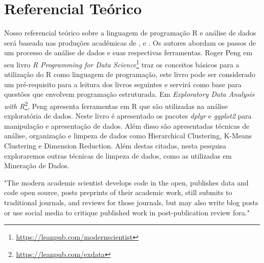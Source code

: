 \chapter[Referencial Teórico]{Referencial Teórico}

Nosso referencial teórico sobre a linguagem de programação R e análise de dados 
será baseada nas produções acadêmicas de , e 
. Os autores abordam os passos de um processo de análise de dados e 
suas respectivas ferramentas. Roger Peng em seu livro \emph{R Programming for Data 
Science}\footnote{\url{https://leanpub.com/modernscientist}}  traz os conceitos básicos para a utilização do R como linguagem de 
programação, este livro pode ser considerado um pré-requisito para a leitura dos 
livros seguintes e servirá como base para questões que envolvem programação 
estruturada. Em \emph{Exploratory Data Analysis with R}\footnote{\url{https://leanpub.com/exdata}}, Peng apresenta ferramentas 
em R que são utilizadas na análise exploratória de dados. Neste livro é 
apresentado os pacotes \emph{dplyr} e \emph{ggplot2} para manipulação e apresentação de 
dados. Além disso são apresentadas técnicas de análise, organização e limpeza de 
dados como Hierarchical Clustering, K-Means Clustering e Dimension Reduction. 
Além destas citadas, nesta pesquisa exploraremos outras técnicas de limpeza de 
dados, como as utilizadas em Mineração de Dados.


\begin{citacao}[english]
  "The modern academic scientist develops code in the open, publishes data and 
code open source, posts preprints of their academic work, still submits to 
traditional journals, and reviews for those journals, but may also write blog 
posts or use social media to critique published work in post-publication review 
fora."\cite{Peng2015}
\end{citacao}
